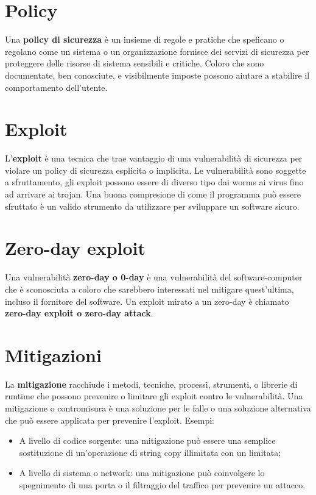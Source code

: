 \section{Policy}
Una \textbf{policy di sicurezza} è un insieme di regole e pratiche che speficano o regolano come un sistema o un organizzazione fornisce dei servizi di sicurezza per proteggere delle risorse di sistema sensibili e critiche. Coloro che sono documentate, ben conosciute, e visibilmente imposte possono aiutare a stabilire il comportamento dell'utente.

\section{Exploit}
L'\textbf{exploit} è una tecnica che trae vantaggio di una vulnerabilità di sicurezza per violare un policy di sicurezza esplicita o implicita. Le vulnerabilità sono soggette a sfruttamento, gli exploit possono essere di diverso tipo dai worms ai virus fino ad arrivare ai trojan. Una buona compresione di come il programma può essere sfruttato è un valido strumento da utilizzare per sviluppare un software sicuro.

\section{Zero-day exploit}
Una vulnerabilità \textbf{zero-day o 0-day} è una vulnerabilità del software-computer che è sconosciuta a coloro che sarebbero interessati nel mitigare quest'ultima, incluso il fornitore del software.  Un exploit mirato a un zero-day è chiamato \textbf{zero-day exploit o zero-day attack}.

\section{Mitigazioni}
La \textbf{mitigazione} racchiude i metodi, tecniche, processi, strumenti, o librerie di runtime che possono prevenire o limitare gli exploit contro le vulnerabilità.
Una mitigazione o contromisura è una soluzione per le falle o una soluzione alternativa che può essere applicata per prevenire l'exploit. Esempi:
\begin{itemize}
    \item A livello di codice sorgente: una mitigazione può essere una semplice sostituzione di un'operazione di string copy illimitata con un limitata;
    \item A livello di sistema o network: una mitigazione può coinvolgere lo spegnimento di una porta o il filtraggio del traffico per prevenire un attacco.
\end{itemize}
